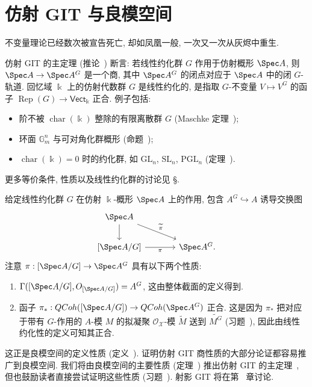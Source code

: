\section{仿射 GIT 与良模空间}\label{src:7.5}
\begin{epigraph}
不变量理论已经数次被宣告死亡, 却如凤凰一般, 一次又一次从灰烬中重生.
\end{epigraph}
仿射 GIT 的主定理 (推论~) 断言: 若线性约化群 $G$ 作用于仿射概形 $\Spec A$, 则 $\Spec A\to\Spec A^G$ 是一个商, 其中 $\Spec A^G$ 的闭点对应于 $\Spec A$ 中的闭 $G$-轨道. 回忆域 $\Bbbk$ 上的仿射代数群 $G$ 是线性约化的, 是指取 $G$-不变量 $V\mapsto V^G$ 的函子 $\operatorname{Rep}(G)\to\mathsf{Vect}_{\Bbbk}$ 正合. 例子包括:
\begin{itemize}
\item 阶不被 $\operatorname{char}(\Bbbk)$ 整除的有限离散群 $G$ (Maschke 定理~);
\item 环面 $\mathbb G_m^n$ 与可对角化群概形 (命题~);
\item $\operatorname{char}(\Bbbk)=0$ 时的约化群, 如 $\mathrm{GL}_n$, $\mathrm{SL}_n$, $\mathrm{PGL}_n$ (定理~).
\end{itemize}
更多等价条件, 性质以及线性约化群的讨论见 \S{}.

给定线性约化群 $G$ 在仿射 $\Bbbk$-概形 $\Spec A$ 上的作用, 包含 $A^G\hookrightarrow A$ 诱导交换图
\begin{align*}
\begin{tikzcd}[ampersand replacement=\&,column sep=large]
\Spec A\arrow[d]\arrow[dr,"{\widetilde\pi}"]\&\\
{[\Spec A/G]}\arrow[r,"{\pi}"']\&\Spec A^G.
\end{tikzcd}
\end{align*}
注意 $\pi:[\Spec A/G]\to\Spec A^G$ 具有以下两个性质:
\begin{enumerate}[(1)]
\item $\Gamma([\Spec A/G],\mathcal O_{[\Spec A/G]})=A^G$, 这由整体截面的定义得到.
\item 函子 $\pi_*:\QCoh([\Spec A/G])\to\QCoh(\Spec A^G)$ 正合. 这是因为 $\pi_*$ 把对应于带有 $G$-作用的 $A$-模 $M$ 的拟凝聚 $\mathcal O_{\mathcal X}$-模 $\widetilde M$ 送到 $\widetilde{M^G}$ (习题~), 因此由线性约化性的定义可知其正合.
\end{enumerate}
这正是良模空间的定义性质 (定义~). 证明仿射 GIT 商性质的大部分论证都容易推广到良模空间. 我们将由良模空间的主要性质 (定理~) 推出仿射 GIT 的主定理~, 但也鼓励读者直接尝试证明这些性质 (习题~). 射影 GIT 将在第~ 章讨论.

